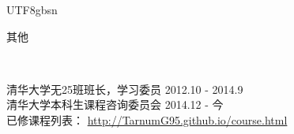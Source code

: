 \documentclass[9pt]{article}
\newenvironment{changemargin}[2]{%
  \begin{list}{}{%
    \setlength{\topsep}{0pt}%
    \setlength{\leftmargin}{#1}%
    \setlength{\rightmargin}{#2}%
    \setlength{\listparindent}{\parindent}%
    \setlength{\itemindent}{\parindent}%
    \setlength{\parsep}{\parskip}%
  }%
  \item[]}{\end{list}
}
\newcommand{\lineover}{
    \begin{changemargin}{-0.05in}{-0.05in}
        \vspace*{-8pt}
        \hrulefill \\
        \vspace*{-2pt}
    \end{changemargin}
}
\newcommand{\header}[1]{
    \begin{changemargin}{-0.5in}{-0.5in}
        \scshape{#1}\\
    \lineover
    \end{changemargin}
}
\newenvironment{body} {
    \vspace*{-16pt}
    \begin{changemargin}{-0.25in}{-0.5in}
  } 
    {\end{changemargin}
}
\begin{document}
\begin{CJK*}{UTF8}{gbsn}
\smallskip
\smallskip






\header{其他}

\begin{body}
    \vspace{14pt}
    清华大学无25班班长，学习委员 \hfill 2012.10 - 2014.9\\
    \smallskip
    清华大学本科生课程咨询委员会 \hfill 2014.12 - 今\\
    \smallskip
    已修课程列表： \href{http://tarnumg95.github.io/course.html}{http://TarnumG95.github.io/course.html}\\


\end{body}

\smallskip
\smallskip

\end{CJK*}
\end{document}
